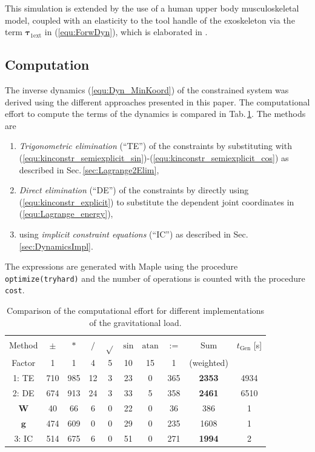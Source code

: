 \documentclass[twocolumn,10pt]{IFTOMM}
\newcommand{\bm}[1]{\boldsymbol{#1}}
\begin{document}
This simulation is extended by the use of a human upper body musculoskeletal model, coupled with an elasticity to the tool handle of the exoskeleton via the term $\bm{\tau}_{1\mathrm{ext}}$ in (\ref{equ:ForwDyn}), which is elaborated in \cite{KuehnHuSchHad2018}.

\subsection{Computation}

The inverse dynamics (\ref{equ:Dyn_MinKoord}) of the constrained system was derived using the different approaches presented in this paper.
The computational effort to compute the terms of the dynamics is compared in Tab.\,\ref{tab:computation}.
The methods are 
%
\begin{enumerate}
    \item \emph{Trigonometric elimination} (``TE'') of the constraints by substituting with (\ref{equ:kinconstr_semiexplicit_sin})-(\ref{equ:kinconstr_semiexplicit_cos}) as described in Sec.\,\ref{sec:Lagrange2Elim}, 
    \item \emph{Direct elimination} (``DE'') of the constraints by directly using (\ref{equ:kinconstr_explicit}) to substitute the dependent joint coordinates in (\ref{equ:Lagrange_energy}),
    \item using \emph{implicit constraint equations} (``IC'') as described in Sec.\,\ref{sec:DynamicsImpl}.
\end{enumerate}
%
The expressions are generated with Maple using the procedure \texttt{optimize(tryhard)} and the number of operations is counted with the procedure \texttt{cost}.
%
\begin{table}
    \caption{Comparison of the computational effort for different implementations of the gravitational load.}\par\vspace{-3ex}
    \label{tab:computation}
    \centering
    \setlength\tabcolsep{3pt}
    \begin{tabular}[t]{|c|c|c|c|c|c|c|c|c|c|}
        \hline
        Method & $\pm$ & $*$ & $/$ & $\sqrt{}$ & $\mathrm{sin}$ & $\mathrm{atan}$ & $:=$ & Sum & $t_{\mathrm{Gen}}$ [s] \\
        Factor & 1 & 1 & 4 & 5 & 10 & 15 & 1 & (weighted) & \\
        \hline
        \rowcolor{Gray}
        1: TE  & 710 & 985 & 12 & 3 & 23 & 0 & 365 & \textbf{2353} & 4934 \\
        \rowcolor{Gray}
        2: DE & 674 & 913 & 24 & 3 & 33 & 5 & 358 & \textbf{2461} & 6510 \\
        $\bm{W}$ & 40 & 66 & 6 & 0 & 22 & 0 & 36 & 386 & 1 \\
        $\bm{g}$ & 474 & 609 & 0 & 0 & 29 & 0 & 235 & 1608 & 1 \\
        \rowcolor{Gray}
        3: IC & 514 & 675 & 6 & 0 & 51 & 0 & 271 & \textbf{1994} & 2 \\
        \hline
    \end{tabular}
\end{table}
%
\end{document}
